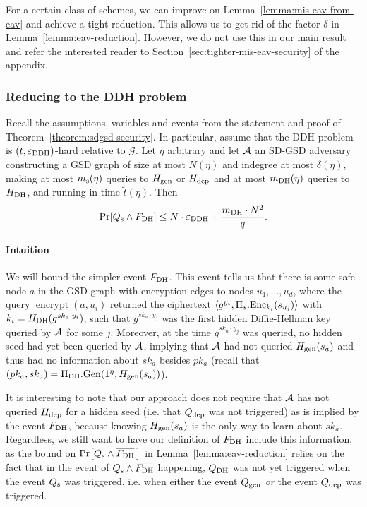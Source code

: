 For a certain class of schemes, we can improve on Lemma~\ref{lemma:mis-eav-from-eav} and achieve a tight reduction. This allows us to get rid of the factor $\delta$ in Lemma~\ref{lemma:eav-reduction}. However, we do not use this in our main result and refer the interested reader to Section~\ref{sec:tighter-mis-eav-security} of the appendix.

\subsubsection{Reducing to the DDH problem}

\begin{lemma} \label{lemma:dh-reduction}
	Recall the assumptions, variables and events from the statement and proof of Theorem~\ref{theorem:sdgsd-security}. In particular, assume that the DDH problem is $(t, \varepsilon_\mathrm{DDH})$-hard relative to $\mathcal{G}$. Let $\eta$ arbitrary and let $\mathcal{A}$ an SD-GSD adversary constructing a GSD graph of size at most $N(\eta)$ and indegree at most $\delta(\eta)$, making at most $m_\mathrm{s}(\eta)$ queries to $H_\mathrm{gen}$ or $H_\mathrm{dep}$ and at most $m_\mathrm{DH}(\eta)$ queries to $H_\mathrm{DH}$, and running in time $\tilde{t}(\eta)$. Then
	\[
		\pr{\qs \land \fdh} \le N \cdot \eddh + \frac{\mdh \cdot N^2}{q}.
	\]
\end{lemma}

\paragraph{Intuition} We will bound the simpler event $F_\mathrm{DH}$. This event tells us that there is some safe node $a$ in the GSD graph with encryption edges to nodes $u_1, \ldots, u_d$, where the query $\operatorname{encrypt}(a, u_i)$ returned the ciphertext $\langle g^{y_i}, \Pi_s.\mathrm{Enc}_{k_i}(s_{u_i}) \rangle$ with $k_i = H_\mathrm{DH}(g^{sk_{a} \cdot y_i})$, such that $g^{sk_a \cdot y_j}$ was the first hidden Diffie-Hellman key queried by $\mathcal{A}$ for some $j$.
Moreover, at the time $g^{sk_a \cdot y_j}$ was queried, no hidden seed had yet been queried by $\mathcal{A}$, implying that $\mathcal{A}$ had not queried $H_\mathrm{gen}(s_a)$ and thus had no information about $sk_a$ besides $pk_a$ (recall that $(pk_a, sk_a) = \Pi_{\mathrm{DH}}.\mathrm{Gen}(1^\eta, H_\mathrm{gen}(s_a))$).

It is interesting to note that our approach does not require that $\mathcal{A}$ has not queried $H_\mathrm{dep}$ for a hidden seed (i.e. that $Q_\mathrm{dep}$ was not triggered) as is implied by the event $F_\mathrm{DH}$, because knowing $H_\mathrm{gen}(s_a)$ is the only way to learn about $sk_a$. Regardless, we still want to have our definition of $F_\mathrm{DH}$ include this information, as the bound on $\pr{\qs \land \overline{\fdh} \,}$ in Lemma~\ref{lemma:eav-reduction} relies on the fact that in the event of $Q_\mathrm{s} \land \overline{F_\mathrm{DH}}$ happening,  $Q_\mathrm{DH}$ was not yet triggered when the event $Q_\mathrm{s}$ was triggered, i.e. when either the event $Q_\mathrm{gen}$ \emph{or} the event $Q_\mathrm{dep}$ was triggered.

